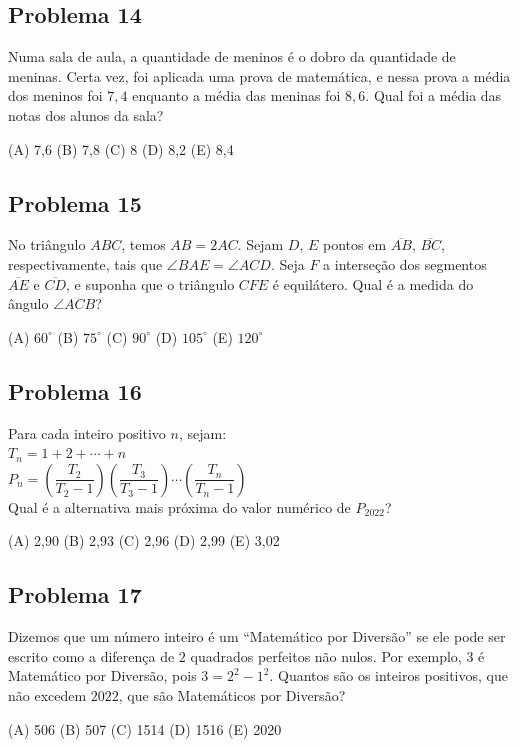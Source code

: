 \documentclass[12pt]{article}
\begin{document}
\subsection{Problema 14}
\begin{tcolorbox}[statementbox]
Numa sala de aula, a quantidade de meninos é o dobro da quantidade de meninas. Certa vez, foi aplicada uma prova de matemática, e nessa prova a média dos meninos foi $7,4$ enquanto a média das meninas foi $8,6$. Qual foi a média das notas dos alunos da sala?

(A) 7,6 (B) 7,8 (C) 8 (D) 8,2 (E) 8,4
\end{tcolorbox}
\clearpage

\subsection{Problema 15}
\begin{tcolorbox}[statementbox]
No triângulo $ABC$, temos $AB=2AC$. Sejam $D$, $E$ pontos em $\overline{AB}$, $\overline{BC}$, respectivamente, tais que $\angle BAE=\angle ACD$. Seja $F$ a interseção dos segmentos $\overline{AE}$ e $\overline{CD}$, e suponha que o triângulo $CFE$ é equilátero. Qual é a medida do ângulo $\angle ACB$?

(A) $60^\circ$ (B) $75^\circ$ (C) $90^\circ$ (D) $105^\circ$ (E) $120^\circ$
\end{tcolorbox}
\clearpage

\subsection{Problema 16}
\begin{tcolorbox}[statementbox]
Para cada inteiro positivo $n$, sejam: \\
$T_n = 1 + 2 + \cdots + n$ \\
$P_n = \left(\dfrac{T_2}{T_2 - 1}\right)\left(\dfrac{T_3}{T_3 - 1}\right)\cdots\left(\dfrac{T_n}{T_n - 1}\right)$ \\
Qual é a alternativa mais próxima do valor numérico de $P_{2022}$?

(A) 2,90 (B) 2,93 (C) 2,96 (D) 2,99 (E) 3,02
\end{tcolorbox}
\clearpage

\subsection{Problema 17}
\begin{tcolorbox}[statementbox]
Dizemos que um número inteiro é um “Matemático por Diversão” se ele pode ser escrito como a diferença de $2$ quadrados perfeitos não nulos. Por exemplo, $3$ é Matemático por Diversão, pois $3=2^2-1^2$. Quantos são os inteiros positivos, que não excedem $2022$, que são Matemáticos por Diversão?

(A) 506 (B) 507 (C) 1514 (D) 1516 (E) 2020
\end{tcolorbox}
\clearpage
\end{document}
